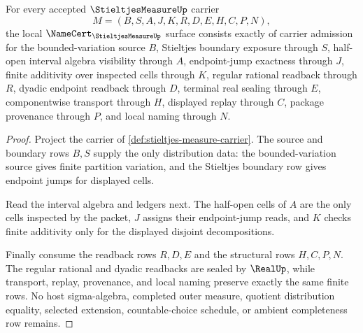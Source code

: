 \begin{theorem}
\label{thm:stieltjes-measure-namecert-obligations}
For every accepted $\StieltjesMeasureUp$ carrier
$$
M=(B,S,A,J,K,R,D,E,H,C,P,N),
$$
the local $\NameCert_{\StieltjesMeasureUp}$ surface consists exactly of carrier admission for the bounded-variation source $B$, Stieltjes boundary exposure through $S$, half-open interval algebra visibility through $A$, endpoint-jump exactness through $J$, finite additivity over inspected cells through $K$, regular rational readback through $R$, dyadic endpoint readback through $D$, terminal real sealing through $E$, componentwise transport through $H$, displayed replay through $C$, package provenance through $P$, and local naming through $N$.
\end{theorem}
\begin{proof}
Project the carrier of \autoref{def:stieltjes-measure-carrier}. The source and boundary rows $B,S$ supply the only distribution data: the bounded-variation source gives finite partition variation, and the Stieltjes boundary row gives endpoint jumps for displayed cells.

Read the interval algebra and ledgers next. The half-open cells of $A$ are the only cells inspected by the packet, $J$ assigns their endpoint-jump reads, and $K$ checks finite additivity only for the displayed disjoint decompositions.

Finally consume the readback rows $R,D,E$ and the structural rows $H,C,P,N$. The regular rational and dyadic readbacks are sealed by $\RealUp$, while transport, replay, provenance, and local naming preserve exactly the same finite rows. No host sigma-algebra, completed outer measure, quotient distribution equality, selected extension, countable-choice schedule, or ambient completeness row remains.
\end{proof}

